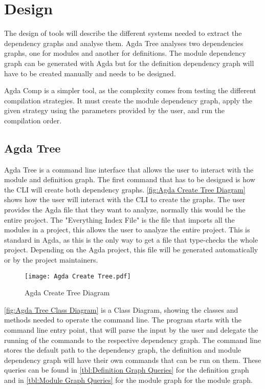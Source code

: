 
\chapter{Design}


The design of tools will describe the different systems needed to extract the
dependency graphs and analyse them. Agda Tree analyses two dependencies graphs,
one for modules and another for definitions. The module dependency graph can be
generated with Agda but for the definition dependency graph will have to be
created manually and needs to be designed.

Agda Comp is a simpler tool, as the complexity comes from testing the different
compilation strategies. It must create the module dependency graph, apply the
given strategy using the parameters provided by the user, and run the compilation
order. 


\pagebreak

\section{Agda Tree}

Agda Tree is a command line interface that allows the user to interact with the
module and definition graph. The first command that has to be designed is how
the CLI will create both dependency graphs. \cref{fig:Agda Create Tree
Diagram} shows how the user will interact with the CLI to create the graphs.
The user provides the Agda file that they want to analyze, normally this would
be the entire project. The "Everything Index File" is the file that imports all
the modules in a project, this allows the user to analyze the entire project.
This is standard in Agda, as this is the only way to get a file that type-checks the whole project. Depending on the Agda project, this file will be
generated automatically or by the project maintainers.
\begin{figure}[H]
    \centering
    \texttt{[image: Agda Create Tree.pdf]}
    \caption{Agda Create Tree Diagram}
    \label{fig:Agda Create Tree Diagram}
\end{figure} 

\pagebreak

\cref{fig:Agda Tree Class Diagram} is a Class Diagram, showing the
classes and methods needed to operate the command line. The program starts with
the command line entry point, that will parse the input by the user and
delegate the running of the commands to the respective dependency graph. The
command line stores the default path to the dependency graph, the definition
and module dependency graph will have their own commands that can be run on
them. These queries can be found in \cref{tbl:Definition Graph Queries}
for the definition graph and in \cref{tbl:Module Graph Queries} for the
module graph for the module graph.

